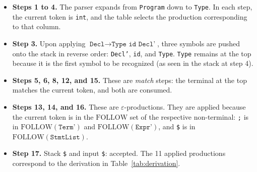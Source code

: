 \documentclass[12pt,letterpaper]{article}
\begin{document}
\begin{itemize}
    \item \textbf{Steps 1 to 4.} The parser expands from \texttt{Program} down to \texttt{Type}. In each step, the current token is \texttt{int}, and the table selects the production corresponding to that column.
    \item \textbf{Step 3.} Upon applying $\texttt{Decl} \rightarrow \texttt{Type id Decl'}$, three symbols are pushed onto the stack in reverse order: \texttt{Decl'}, \texttt{id}, and \texttt{Type}. \texttt{Type} remains at the top because it is the first symbol to be recognized (as seen in the stack at step 4).
    \item \textbf{Steps 5, 6, 8, 12, and 15.} These are \textit{match} steps: the terminal at the top matches the current token, and both are consumed.
    \item \textbf{Steps 13, 14, and 16.} These are $\varepsilon$-productions. They are applied because the current token is in the $\text{FOLLOW}$ set of the respective non-terminal: \texttt{;} is in $\text{FOLLOW}(\texttt{Term'})$ and $\text{FOLLOW}(\texttt{Expr'})$, and \texttt{\$} is in $\text{FOLLOW}(\texttt{StmtList})$.
    \item \textbf{Step 17.} Stack \texttt{\$} and input \texttt{\$}: accepted. The 11 applied productions correspond to the derivation in Table~\ref{tab:derivation}.
\end{itemize}
\end{document}
